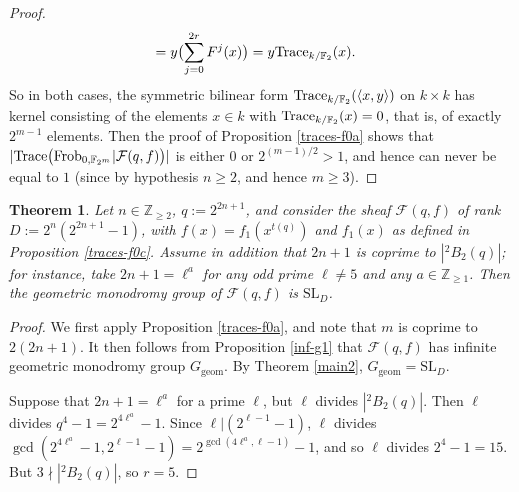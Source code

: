 \documentclass[11pt]{amsart}
\theoremstyle{plain}
\newtheorem{thm}{Theorem}
\theoremstyle{definition}
\numberwithin{thm}{section}
\numberwithin{equation}{thm}
\newcommand{\Trace}{{\rm Trace}}
\newcommand{\SL}{\mathrm{SL}}
\newcommand{\sF}{{\mathcal F}}
\newcommand{\F}{{\mathbb F}}
\newcommand{\Z}{{\mathbb Z}}
\newcommand{\0}{\emptyset}
\newcommand{\geo}{{\mathrm {geom}}}
\newcommand{\tw}[1]{{}^#1\!}
\newcommand{\Frob}{\mathrm{Frob}}
\begin{document}
\begin{proof}
$$\begin{aligned}
   & = y\bigl(\sum^{2r}_{j=0}F^j(x)\bigr) 
     =  y\Trace_{k/\F_2}(x).\end{aligned}$$
So in both cases, the symmetric bilinear form $\Trace_{k/\F_2}(\langle x,y \rangle)$ on $k \times k$ has kernel consisting 
of the elements $x \in k$ with $\Trace_{k/\F_2}(x)=0$, that is, of exactly $2^{m-1}$ elements.
Then the proof of Proposition 
\ref{traces-f0a} shows that $|\Trace\bigl(\Frob_{0,\F_{2^m}}|\sF(q,f)\bigr)|$ is either $0$ or $2^{(m-1)/2} >1$, and hence can never be 
equal to $1$ (since by hypothesis $n \geq 2$, and hence $m \ge 3$).
\end{proof} 

\begin{thm}\label{inf-g}
Let $n \in \Z_{\geq 2}$, $q:=2^{2n+1}$, and consider the sheaf $\sF(q,f)$ of rank $D:=2^n(2^{2n+1}-1)$, 
with $f(x)=f_1(x^{t(q)})$ and $f_1(x)$ as defined in
Proposition \ref{traces-f0c}. Assume in addition that $2n+1$ is coprime to $|\tw2 B_2(q)|$; for instance, take $2n+1=\ell^a$
for any odd prime $\ell \neq 5$ and any
$a \in \Z_{\geq 1}$.
Then the geometric monodromy group of $\sF(q,f)$ is $\SL_D$.
\end{thm}
 
\begin{proof}
We first apply Proposition \ref{traces-f0a}, and note that $m$ is coprime to $2(2n+1)$. It then follows from Proposition 
\ref{inf-g1} that $\sF(q,f)$ has infinite geometric monodromy group $G_\geo$. By Theorem \ref{main2}, $G_\geo=\SL_D$.

Suppose that $2n+1=\ell^a$ for a prime $\ell$, but $\ell$ divides $|\tw2 B_2(q)|$. Then $\ell$ divides $q^4-1 = 2^{4\ell^a}-1$. 
Since $\ell|(2^{\ell-1}-1)$, $\ell$ divides $\gcd(2^{4\ell^a}-1,2^{\ell-1}-1) = 2^{\gcd(4\ell^a,\ell-1)}-1$, and so $\ell$ divides $2^4-1=15$. 
But $3 \nmid |\tw2 B_2(q)|$, so $r=5$.
\end{proof} 
\end{document}
